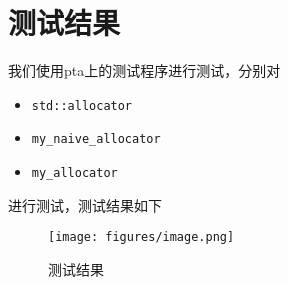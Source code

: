 \documentclass[12pt,hyperref,a4paper,UTF8]{ctexart}
\begin{document}
\section{测试结果}
我们使用pta上的测试程序进行测试，分别对
\begin{itemize}
    \item \verb|std::allocator|
    \item \verb|my_naive_allocator|
    \item \verb|my_allocator|
\end{itemize}
进行测试，测试结果如下
\begin{figure}[!h]
    \centering
    \texttt{[image: figures/image.png]}
    \caption{测试结果}
\end{figure}
\end{document}
